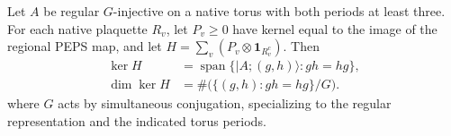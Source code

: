 \begin{lemma}%
    \label{thm:peps_regular_torus_parent_ground_space}
    \leanok
    Let $A$ be regular $G$-injective on a native torus with both
    periods at least three. For each native plaquette $R_v$, let
    $P_v\ge0$ have kernel equal to the image of the regional PEPS map,
    and let $H=\sum_v(P_v\otimes\mathbf1_{R_v^c})$. Then
    \begin{align}
        \ker H     & =\operatorname{span}\{\lvert A;(g,h)\rangle:gh=hg\},
        \label{eq:peps_regular_parent_kernel}                             \\
        \dim\ker H & =\#\bigl(\{(g,h):gh=hg\}/G\bigr).
        \label{eq:peps_regular_parent_dimension}
    \end{align}
    where $G$ acts by simultaneous conjugation, specializing
    \cite[Theorems~5.7 and~5.9]{Schuch2010PEPS}
    to the regular representation and the indicated torus periods.
\end{lemma}
